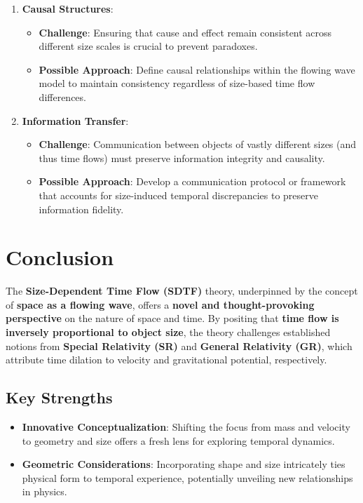 \documentclass[12pt]{article}
\begin{document}
\begin{enumerate}
    \item \textbf{Causal Structures}:
    \begin{itemize}
        \item \textbf{Challenge}: Ensuring that cause and effect remain consistent across different size scales is crucial to prevent paradoxes.
        \item \textbf{Possible Approach}: Define causal relationships within the flowing wave model to maintain consistency regardless of size-based time flow differences.
    \end{itemize}
    
    \item \textbf{Information Transfer}:
    \begin{itemize}
        \item \textbf{Challenge}: Communication between objects of vastly different sizes (and thus time flows) must preserve information integrity and causality.
        \item \textbf{Possible Approach}: Develop a communication protocol or framework that accounts for size-induced temporal discrepancies to preserve information fidelity.
    \end{itemize}
\end{enumerate}

\section{Conclusion}

The \textbf{Size-Dependent Time Flow (SDTF)} theory, underpinned by the concept of \textbf{space as a flowing wave}, offers a \textbf{novel and thought-provoking perspective} on the nature of space and time. By positing that \textbf{time flow is inversely proportional to object size}, the theory challenges established notions from \textbf{Special Relativity (SR)} and \textbf{General Relativity (GR)}, which attribute time dilation to velocity and gravitational potential, respectively.

\subsection{Key Strengths}
\begin{itemize}
    \item \textbf{Innovative Conceptualization}: Shifting the focus from mass and velocity to geometry and size offers a fresh lens for exploring temporal dynamics.
    \item \textbf{Geometric Considerations}: Incorporating shape and size intricately ties physical form to temporal experience, potentially unveiling new relationships in physics.
\end{itemize}
\end{document}
